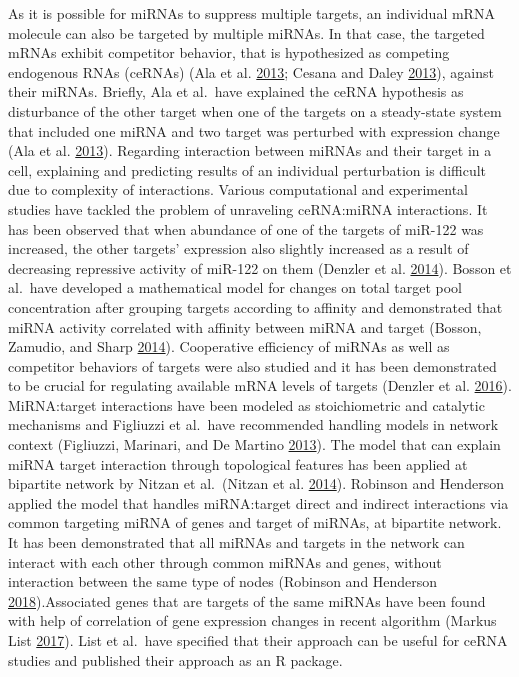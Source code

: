 \documentclass[]{article}
\begin{document}
As it is possible for miRNAs to suppress multiple targets, an individual
mRNA molecule can also be targeted by multiple miRNAs. In that case, the
targeted mRNAs exhibit competitor behavior, that is hypothesized as
competing endogenous RNAs (ceRNAs) (Ala et al.
\protect\hyperlink{ref-ala_integrated_2013}{2013}; Cesana and Daley
\protect\hyperlink{ref-cesana_deciphering_2013}{2013}), against their
miRNAs. Briefly, Ala et al.~have explained the ceRNA hypothesis as
disturbance of the other target when one of the targets on a
steady-state system that included one miRNA and two target was perturbed
with expression change (Ala et al.
\protect\hyperlink{ref-ala_integrated_2013}{2013}). Regarding
interaction between miRNAs and their target in a cell, explaining and
predicting results of an individual perturbation is difficult due to
complexity of interactions. Various computational and experimental
studies have tackled the problem of unraveling ceRNA:miRNA interactions.
It has been observed that when abundance of one of the targets of
miR-122 was increased, the other targets' expression also slightly
increased as a result of decreasing repressive activity of miR-122 on
them (Denzler et al.
\protect\hyperlink{ref-denzler_assessing_2014}{2014}). Bosson et
al.~have developed a mathematical model for changes on total target pool
concentration after grouping targets according to affinity and
demonstrated that miRNA activity correlated with affinity between miRNA
and target (Bosson, Zamudio, and Sharp
\protect\hyperlink{ref-bosson_endogenous_2014}{2014}). Cooperative
efficiency of miRNAs as well as competitor behaviors of targets were
also studied and it has been demonstrated to be crucial for regulating
available mRNA levels of targets (Denzler et al.
\protect\hyperlink{ref-denzler_impact_2016}{2016}). MiRNA:target
interactions have been modeled as stoichiometric and catalytic
mechanisms and Figliuzzi et al.~have recommended handling models in
network context (Figliuzzi, Marinari, and De Martino
\protect\hyperlink{ref-figliuzzi_micrornas_2013}{2013}). The model that
can explain miRNA target interaction through topological features has
been applied at bipartite network by Nitzan et al.~(Nitzan et al.
\protect\hyperlink{ref-nitzan_interactions_2014}{2014}). Robinson and
Henderson applied the model that handles miRNA:target direct and
indirect interactions via common targeting miRNA of genes and target of
miRNAs, at bipartite network. It has been demonstrated that all miRNAs
and targets in the network can interact with each other through common
miRNAs and genes, without interaction between the same type of nodes
(Robinson and Henderson
\protect\hyperlink{ref-robinson_modelling_2018}{2018}).Associated genes
that are targets of the same miRNAs have been found with help of
correlation of gene expression changes in recent algorithm (Markus List
\protect\hyperlink{ref-markus_list_sponge_2017}{2017}). List et al.~have
specified that their approach can be useful for ceRNA studies and
published their approach as an R package.
\end{document}
